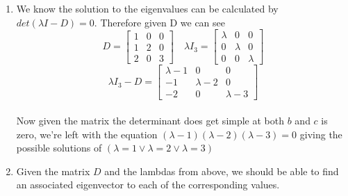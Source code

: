 \documentclass[a4paper, 12pt]{article}
\begin{document}
{\begin{enumerate}
\[\begin{bmatrix}
		2 & 1 \\
		1 & -2
		\end{bmatrix} = \begin{bmatrix}
		2+-1 & 2+2 \\
		1+2 & 1+-4
		\end{bmatrix} = \begin{bmatrix}
		1 & 4 \\
		3 & -3
		\end{bmatrix}
	\]
	\[
		B^TA^T = (AB)^T = \begin{bmatrix}
		1 & 4 \\
		3 & -3
		\end{bmatrix}
	\]
	\item
	We know the solution to the eigenvalues can be calculated by $det(\lambda I-D)=0$. Therefore given D we can see
	\[
		D = \begin{bmatrix}
		1 & 0 & 0 \\
		1 & 2 & 0 \\
		2 & 0 & 3
		\end{bmatrix} \quad \lambda I_3 = \begin{bmatrix}
		\lambda & 0 & 0 \\
		0 & \lambda & 0 \\
		0 & 0 & \lambda
		\end{bmatrix}
	\]
	\[
		\lambda I_3 - D = \begin{bmatrix}
		\lambda - 1 & 0 & 0 \\
		-1 & \lambda - 2 & 0 \\
		-2 & 0 & \lambda - 3
		\end{bmatrix}
	\]\\
	
	Now given the matrix the determinant does get simple at both $b$ and $c$ is zero, we're left with the equation $(\lambda - 1)(\lambda - 2)(\lambda - 3)=0$ giving the possible solutions of $(\lambda = 1 \vee \lambda = 2 \vee \lambda = 3)$
	
	\item
	Given the matrix $D$ and the lambdas from above, we should be able to find an associated eigenvector to each of the corresponding values.\\
	

\end{enumerate}}
\end{document}
